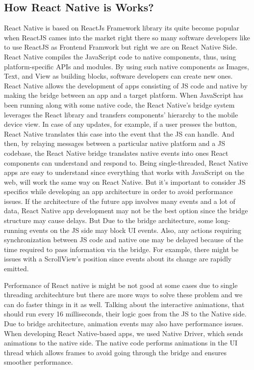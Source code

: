 \documentclass[12pt,a4paper]{article}
\begin{document}
\subsection*{How React Native is Works?}
\qquad React Native is based on ReactJs Framework library its quite become popular when ReactJS cames into the market right there so many software developers like to use ReactJS as Frontend Framwork but right we are on React Native Side. React Native compiles the JavaScript code to native components, thus, using platform-specific APIs and modules. By using such native components as Images, Text, and View as building blocks, software developers can create new ones.
React Native allows the development of apps consisting of JS code and native by making the bridge between an app and a target platform. When JavaScript has been running along with some native code, the React Native’s bridge system leverages the React library and transfers components’ hierarchy to the mobile device view. In case of any updates, for example, if a user presses the button, React Native translates this case into the event that the JS can handle. And then, by relaying messages between a particular native platform and a JS codebase, the React Native bridge translates native events into ones React components can understand and respond to. Being single-threaded, React Native apps are easy to understand since everything that works with JavaScript on the web, will work the same way on React Native. But it’s important to consider JS specifics while developing an app architecture in order to avoid performance issues. If the architecture of the future app involves many events and a lot of data, React Native app development may not be the best option since the bridge structure may cause delays. But Due to the bridge architecture, some long-running events on the JS side may block UI events. Also, any actions requiring synchronization between JS code and native one may be delayed because of the time required to pass information via the bridge. For example, there might be issues with a ScrollView’s position since events about its change are rapidly emitted.
\par
Performance of React native is might be not good at some cases due to single threading architechture but there are more ways to solve these problem and we can do faster things in it as well. Talking about the interactive animations, that should run every 16 milliseconds, their logic goes from the JS to the Native side. Due to bridge architecture, animation events may also have performance issues. When developing React Native-based apps, we used Native Driver, which sends animations to the native side. The native code performs animations in the UI thread which allows frames to avoid going through the bridge and ensures smoother performance. 
\end{document}
